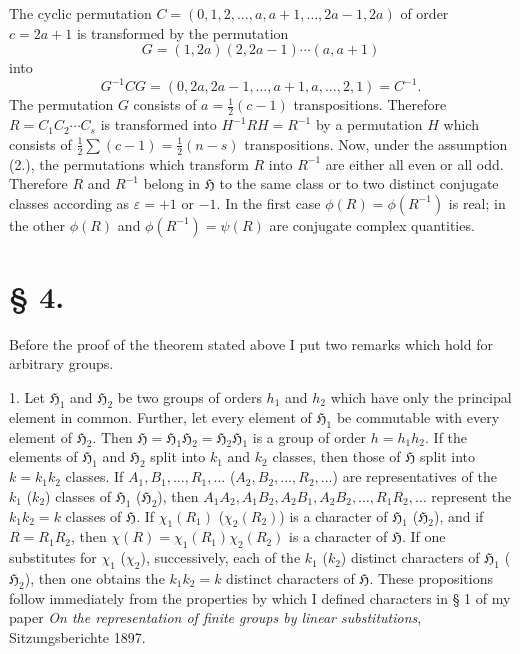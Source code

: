 \documentclass[11pt]{article}
\newcommand{\Hgr}{\mathfrak{H}}
\newcommand{\eps}{\varepsilon}
\begin{document}
The cyclic permutation $C=(0,1,2,\ldots,a,a+1,\ldots,2a-1,2a)$ of order $c=2a+1$ is transformed by the permutation
\[
 G=(1,2a)(2,2a-1)\cdots(a,a+1)
\]
into
\[
 G^{-1}CG=(0,2a,2a-1,\ldots,a+1,a,\ldots,2,1)=C^{-1}.
\]
The permutation $G$ consists of $a=\frac12(c-1)$ transpositions. Therefore $R=C_1C_2\cdots C_s$ is transformed into $H^{-1}RH=R^{-1}$ by a permutation $H$ which consists of $\frac12\sum(c-1)=\frac12(n-s)$ transpositions. Now, under the assumption (2.), the permutations which transform $R$ into $R^{-1}$ are either all even or all odd. Therefore $R$ and $R^{-1}$ belong in $\Hgr$ to the same class or to two distinct conjugate classes according as $\eps=+1$ or $-1$. In the first case $\phi(R)=\phi(R^{-1})$ is real; in the other $\phi(R)$ and $\phi(R^{-1})=\psi(R)$ are conjugate complex quantities.

\section*{§ 4.}

Before the proof of the theorem stated above I put two remarks which hold for arbitrary groups.

1. Let $\Hgr_1$ and $\Hgr_2$ be two groups of orders $h_1$ and $h_2$ which have only the principal element in common. Further, let every element of $\Hgr_1$ be commutable with every element of $\Hgr_2$. Then $\Hgr=\Hgr_1\Hgr_2=\Hgr_2\Hgr_1$ is a group of order $h=h_1h_2$. If the elements of $\Hgr_1$ and $\Hgr_2$ split into $k_1$ and $k_2$ classes, then those of $\Hgr$ split into $k=k_1k_2$ classes. If $A_1,B_1,\ldots,R_1,\ldots$ ($A_2,B_2,\ldots,R_2,\ldots$) are representatives of the $k_1$ ($k_2$) classes of $\Hgr_1$ ($\Hgr_2$), then $A_1A_2,A_1B_2,A_2B_1,A_2B_2,\ldots,R_1R_2,\ldots$ represent the $k_1k_2=k$ classes of $\Hgr$. If $\chi_1(R_1)$ ($\chi_2(R_2)$) is a character of $\Hgr_1$ ($\Hgr_2$), and if $R=R_1R_2$, then $\chi(R)=\chi_1(R_1)\chi_2(R_2)$ is a character of $\Hgr$. If one substitutes for $\chi_1$ ($\chi_2$), successively, each of the $k_1$ ($k_2$) distinct characters of $\Hgr_1$ ($\Hgr_2$), then one obtains the $k_1k_2=k$ distinct characters of $\Hgr$. These propositions follow immediately from the properties by which I defined characters in § 1 of my paper \emph{On the representation of finite groups by linear substitutions}, Sitzungsberichte 1897.
\end{document}

